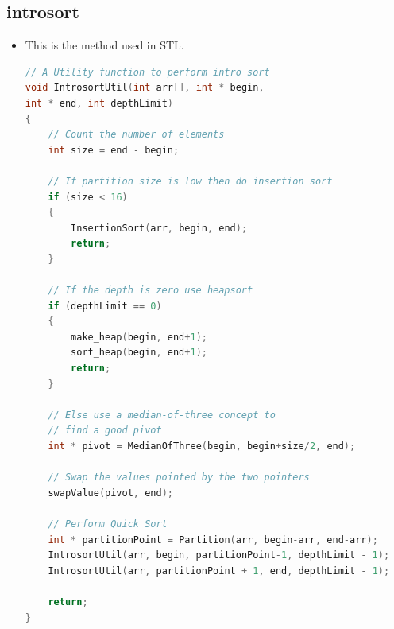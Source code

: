 \documentclass[a4paper,11pt,twoside]{book}
\begin{document}
\subsection{introsort}
\begin{itemize}
	\item This is the method used in STL.
	
\begin{lstlisting}[frame=single, language=c++]
// A Utility function to perform intro sort
void IntrosortUtil(int arr[], int * begin,
int * end, int depthLimit)
{
	// Count the number of elements
	int size = end - begin;
	
	// If partition size is low then do insertion sort
	if (size < 16)
	{
		InsertionSort(arr, begin, end);
		return;
	}
	
	// If the depth is zero use heapsort
	if (depthLimit == 0)
	{
		make_heap(begin, end+1);
		sort_heap(begin, end+1);
		return;
	}
	
	// Else use a median-of-three concept to
	// find a good pivot
	int * pivot = MedianOfThree(begin, begin+size/2, end);
	
	// Swap the values pointed by the two pointers
	swapValue(pivot, end);
	
	// Perform Quick Sort
	int * partitionPoint = Partition(arr, begin-arr, end-arr);
	IntrosortUtil(arr, begin, partitionPoint-1, depthLimit - 1);
	IntrosortUtil(arr, partitionPoint + 1, end, depthLimit - 1);
	
	return;
}	
\end{lstlisting}

\end{itemize}
\end{document}

